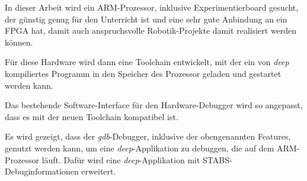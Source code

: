 In dieser Arbeit wird ein ARM-Prozessor, inklusive Experimentierboard gesucht, der günstig genug für den Unterricht ist und eine sehr gute Anbindung an ein FPGA hat, damit auch anspruchsvolle Robotik-Projekte damit realisiert werden können.

Für diese Hardware wird dann eine Toolchain entwickelt, mit der ein von \textit{deep} kompiliertes Programm in den Speicher des Prozessor geladen und gestartet werden kann.

Das bestehende Software-Interface für den Hardware-Debugger wird so angepasst, dass es mit der neuen Toolchain kompatibel ist.

Es wird gezeigt, dass der \textit{gdb}-Debugger, inklusive der obengenannten Features, genutzt werden kann, um eine \textit{deep}-Applikation zu debuggen, die auf dem ARM-Prozessor läuft.
Dafür wird eine \textit{deep}-Applikation mit STABS-Debuginformationen erweitert.






